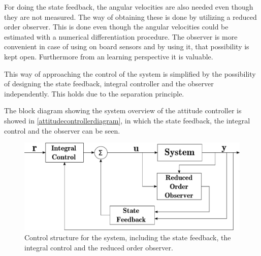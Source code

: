 For doing the state feedback, the angular velocities are also needed even though they are not measured. The way of obtaining these is done by utilizing a reduced order observer. This is done even though the angular velocities could be estimated with a numerical differentiation procedure. The observer is more convenient in case of using on board sensors and by using it, that possibility is kept open. Furthermore from an learning perspective it is valuable.

This way of approaching the control of the system is simplified by the possibility of designing the state feedback, integral controller and the observer independently. This holds due to the separation principle.

The block diagram showing the system overview of the attitude controller is showed in \autoref{attitudecontrollerdiagram}, in which the state feedback, the integral control and the observer can be seen.
\begin{figure}[H]
	\includegraphics[scale=.5]{figures/AttitudeControlDiagram}
	\centering
	\caption{Control structure for the system, including the state feedback, the integral control and the reduced order observer.}
	\label{attitudecontrollerdiagram}
\end{figure}


%
%